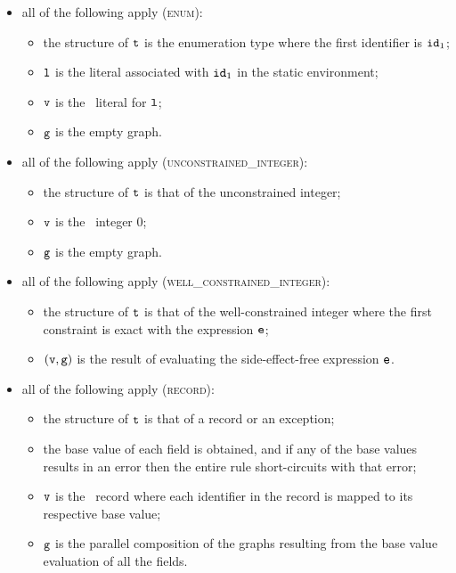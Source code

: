 \begin{itemize}
  \item all of the following apply (\textsc{enum}):
  \begin{itemize}
    \item the structure of $\texttt{t}$ is the enumeration type where the first identifier is $\texttt{id}_1$;
    \item $\texttt{l}$ is the literal associated with $\texttt{id}_1$ in the static environment;
    \item $\texttt{v}$ is the \nativevalue\  literal for $\texttt{l}$;
    \item $\texttt{g}$ is the empty graph.
  \end{itemize}

  \item all of the following apply (\textsc{unconstrained\_integer}):
  \begin{itemize}
    \item the structure of $\texttt{t}$ is that of the unconstrained integer;
    \item $\texttt{v}$ is the \nativevalue\  integer $0$;
    \item $\texttt{g}$ is the empty graph.
  \end{itemize}

  \item all of the following apply (\textsc{well\_constrained\_integer}):
  \begin{itemize}
    \item the structure of $\texttt{t}$ is that of the well-constrained integer where the first constraint
    is exact with the expression $\texttt{e}$;
    \item $(\texttt{v}, \texttt{g})$ is the result of evaluating the side-effect-free expression $\texttt{e}$.
  \end{itemize}

  \item all of the following apply (\textsc{record}):
  \begin{itemize}
    \item the structure of $\texttt{t}$ is that of a record or an exception;
    \item the base value of each field is obtained, and if any of the base values results in an error
    then the entire rule short-circuits with that error;
    \item $\texttt{v}$ is the \nativevalue\  record where each identifier in the record is mapped to its
    respective base value;
    \item $\texttt{g}$ is the parallel composition of the graphs resulting from the base value evaluation
    of all the fields.
  \end{itemize}


\end{itemize}
